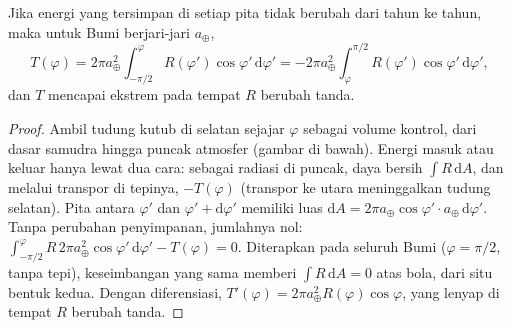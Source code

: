 \begin{proposition}\label{prop:b1:radiation-heat-transport:mht}
Jika energi yang tersimpan di setiap pita  tidak berubah dari tahun ke tahun, maka untuk Bumi berjari-jari $a_\oplus$,
\[
  T(\varphi) = 2\pi a_\oplus^2\int_{-\pi/2}^{\varphi} R(\varphi')\cos\varphi'\,
  \mathrm d\varphi' = -2\pi a_\oplus^2\int_{\varphi}^{\pi/2} R(\varphi')\cos
  \varphi'\,\mathrm d\varphi' ,
\]
dan $T$ mencapai ekstrem pada  tempat $R$ berubah tanda.
\end{proposition}

\begin{proof}
Ambil tudung kutub di selatan sejajar $\varphi$ sebagai volume kontrol, dari dasar
samudra hingga puncak atmosfer (gambar di bawah). Energi masuk atau keluar hanya lewat dua cara:
sebagai radiasi di puncak, daya bersih
$\int R\,\mathrm dA$, dan melalui transpor di tepinya, $-T(\varphi)$ (transpor ke utara
meninggalkan tudung selatan). Pita antara $\varphi'$ dan
$\varphi' + \mathrm d\varphi'$ memiliki luas $\mathrm dA = 2\pi a_\oplus\cos\varphi'
\cdot a_\oplus\,\mathrm d\varphi'$. Tanpa perubahan penyimpanan, jumlahnya nol:
$\int_{-\pi/2}^{\varphi} R\,2\pi a_\oplus^2\cos\varphi'\,\mathrm d\varphi' -
T(\varphi) = 0$. Diterapkan pada seluruh Bumi ($\varphi = \pi/2$, tanpa tepi), keseimbangan yang sama
memberi $\int R\,\mathrm dA = 0$ atas bola, dari situ bentuk kedua.
Dengan diferensiasi, $T'(\varphi) = 2\pi a_\oplus^2 R(\varphi)\cos\varphi$, yang
lenyap di tempat $R$ berubah tanda.
\end{proof}

